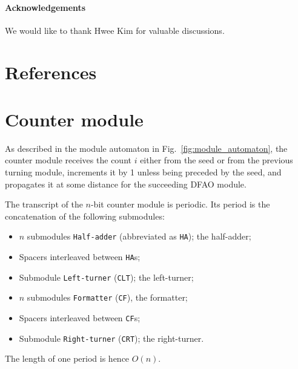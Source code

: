 \documentclass[dvipdfmx,review]{elsarticle}
\begin{document}
\paragraph{Acknowledgements} 
We would like to thank Hwee Kim for valuable discussions. 




\section*{References}





	\newpage
	\appendix



	\section{Counter module}
	\label{sect:appendix_counter_module}

As described in the module automaton in Fig.~\ref{fig:module_automaton}, the counter module receives the count $i$ either from the seed or from the previous turning module, increments it by 1 unless being preceded by the seed, and propagates it at some distance for the succeeding DFAO module. 

The transcript of the $n$-bit counter module is periodic. 
Its period is the concatenation of the following submodules: 
\begin{itemize}
\item $n$ submodules \texttt{Half-adder} (abbreviated as \texttt{HA}); the half-adder; 
\item Spacers interleaved between \texttt{HA}s; 
\item Submodule \texttt{Left-turner} (\texttt{CLT}); the left-turner; 
\item $n$ submodules \texttt{Formatter} (\texttt{CF}), the formatter; 
\item Spacers interleaved between \texttt{CF}s; 
\item Submodule \texttt{Right-turner} (\texttt{CRT}); the right-turner.
\end{itemize}
The length of one period is hence $O(n)$. 
\end{document}
